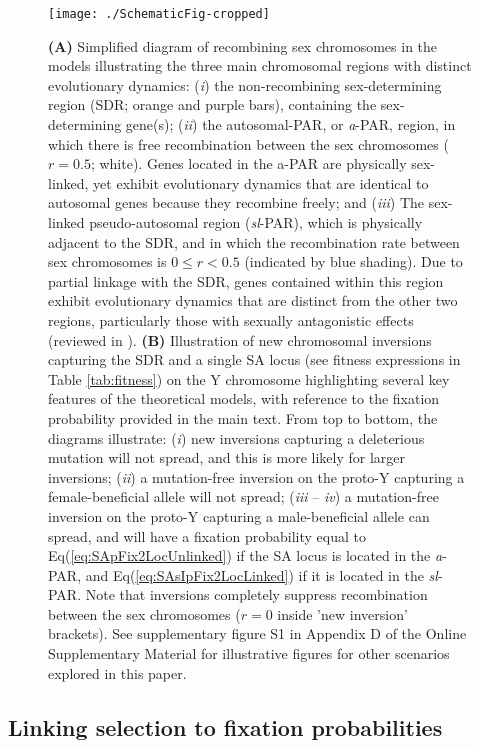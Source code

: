 \documentclass{article}
\begin{document}
 \begin{figure}[htbp]
 \centering
 \texttt{[image: ./SchematicFig-cropped]}
 \caption{\textbf{(A)} Simplified diagram of recombining sex chromosomes in the models illustrating the three main chromosomal regions with distinct evolutionary dynamics: ({\itshape i}) the non-recombining sex-determining region (SDR; orange and purple bars), containing the sex-determining gene(s); ({\itshape ii}) the autosomal-PAR, or {\itshape a}-PAR, region, in which there is free recombination between the sex chromosomes ($r = 0.5$; white). Genes located in the a-PAR are physically sex-linked, yet exhibit evolutionary dynamics that are identical to autosomal genes because they recombine freely; and ({\itshape iii}) The sex-linked pseudo-autosomal region ({\itshape sl}-PAR), which is physically adjacent to the SDR, and in which the recombination rate between sex chromosomes is $0 \leq r < 0.5$ (indicated by blue shading). Due to partial linkage with the SDR, genes contained within this region exhibit evolutionary dynamics that are distinct from the other two regions, particularly those with sexually antagonistic effects (reviewed in \citealt{Otto2011}). \textbf{(B)} Illustration of new chromosomal inversions capturing the SDR and a single SA locus (see fitness expressions in Table \ref{tab:fitness}) on the Y chromosome highlighting several key features of the theoretical models, with reference to the fixation probability provided in the main text. From top to bottom, the diagrams illustrate: ({\itshape i}) new inversions capturing a deleterious mutation will not spread, and this is more likely for larger inversions; ({\itshape ii}) a mutation-free inversion on the proto-Y capturing a female-beneficial allele will not spread; ({\itshape iii} -- {\itshape iv}) a mutation-free inversion on the proto-Y capturing a male-beneficial allele can spread, and will have a fixation probability equal to Eq(\ref{eq:SApFix2LocUnlinked}) if the SA locus is located in the {\itshape a}-PAR, and Eq(\ref{eq:SAsIpFix2LocLinked}) if it is located in the {\itshape sl}-PAR. Note that inversions completely suppress recombination between the sex chromosomes ($r = 0$ inside 'new inversion' brackets). See supplementary figure S1 in Appendix D of the Online Supplementary Material for illustrative figures for other scenarios explored in this paper.}
 \label{fig:diagramFig}
 \end{figure}


\subsection*{Linking selection to fixation probabilities}
\end{document}
